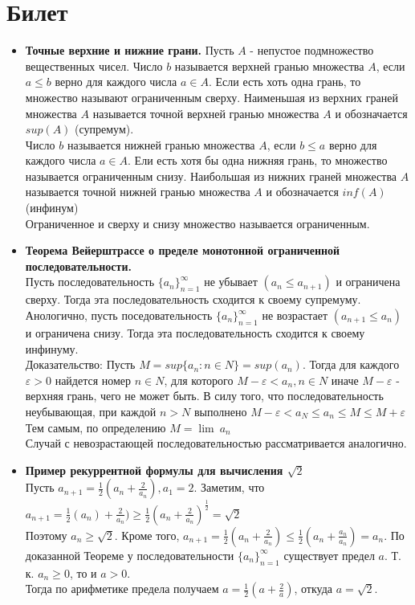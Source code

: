 \documentclass[12pt,a4paper]{article}
\begin{document}
\section{Билет}
\begin{itemize}
	\item \textbf{Точные верхние и нижние грани.}
	Пусть $A$ - непустое подмножество вещественных чисел.
	Число $b$ называется верхней гранью множества $A$, если $a \leq b$ верно для каждого числа $a \in A$. Если есть хоть одна грань, то множество называют ограниченным сверху. Наименьшая из верхних граней множества $A$ называется точной верхней гранью множества $A$ и обозначается $sup(A)$ (супремум).\\
	Число $b$ называется нижней гранью множества $A$, если $b \leq a$ верно для каждого числа $a \in A$. Ели есть хотя бы одна нижняя грань, то множество называется ограниченным снизу. Наибольшая из нижних граней множества $A$ называется точной нижней гранью множества  $A$ и обозначается $inf(A)$ (инфинум)\\
	Ограниченное и сверху и снизу множество называется ограниченным.
	\item \textbf{Теорема Вейерштрассе о пределе монотонной ограниченной последовательности.} \\
	Пусть последовательность $\{a_n\}_{n=1}^{\infty}$ не убывает $(a_n \leq a_{n + 1})$ и ограничена сверху. Тогда эта последовательность сходится к своему супремуму.\\
	Анологично, пусть поседовательность $\{a_n\}_{n=1}^{\infty}$ не возрастает $(a_{n + 1} \leq a_n)$ и ограничена снизу. Тогда эта последовательность сходится к своему инфинуму.\\
	Доказательство: Пусть $M = sup\{a_n : n \in N\} = sup(a_n)$. Тогда для каждого $\varepsilon > 0$ найдется номер $n \in N$, для которого $M - \varepsilon < a_n, n \in N$ иначе $M - \varepsilon$ - верхняя грань, чего не может быть. В силу того, что последовательность неубывающая, при каждой $n > N$ выполнено $M - \varepsilon < a_N \leq a_n \leq M \leq M + \varepsilon $\\
	Тем самым, по определению $M = \lim\ a_n$\\
	Случай с невозрастающей последовательностью рассматривается аналогично.\\
	\item \textbf{Пример рекуррентной формулы для вычисления $\sqrt2$\\}
	Пусть $a_{n + 1} = \frac{1}{2} (a_n + \frac{2}{a_n}), a_1 = 2$. Заметим, что $a_{n + 1} = \frac{1}{2} (a_n) + \frac{2}{a_n}) \geq \frac{1}{2} (a_n + \frac{2}{a_n})^{\frac{1}{2}} = \sqrt2$\\
	Поэтому $a_n \geq \sqrt2$. Кроме того, $a_{n + 1} = \frac{1}{2} (a_n + \frac{2}{a_n}) \leq \frac{1}{2} (a_n + \frac{a_n}{a_n}) = a_n$. По доказанной Теореме у последовательности $\{a_n\}_{n=1}^{\infty}$ существует предел $a$. Т. к. $a_n \geq 0$, то и $a > 0$.\\
	Тогда по арифметике предела получаем $a = \frac{1}{2} (a + \frac{2}{a})$, откуда $a = \sqrt2$.

\end{itemize}
\end{document}
